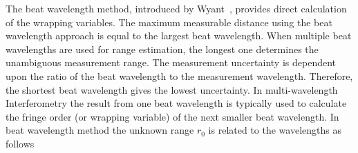 The beat wavelength method, introduced by Wyant~\cite{Wyant:71}, provides direct calculation of the wrapping variables. The maximum measurable distance using the beat wavelength approach is equal to the largest beat wavelength. 
When multiple beat wavelengths are used for range estimation, the longest one determines the unambiguous measurement range. The measurement uncertainty is dependent upon the ratio of the beat wavelength to the measurement wavelength. Therefore, the shortest beat wavelength gives the lowest uncertainty. In multi-wavelength Interferometry the result from one beat wavelength is typically used to calculate the fringe order (or wrapping variable) of the next smaller beat wavelength. In beat wavelength method the unknown range $r_0$ is related to the wavelengths as follows~\cite{Falaggis-generalized-th-of-PU-2012}
